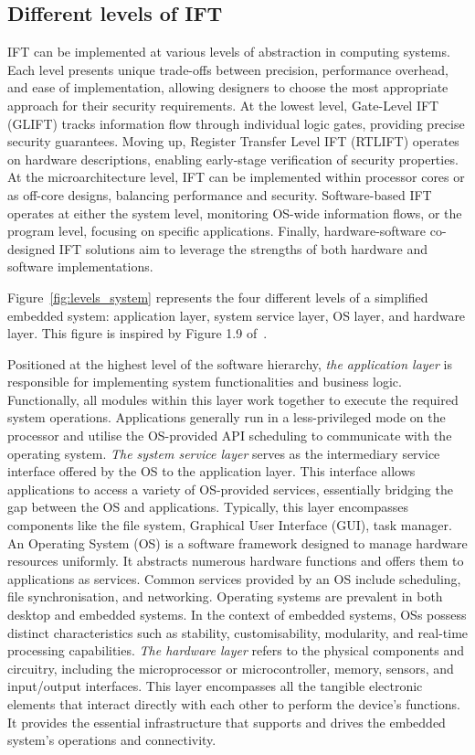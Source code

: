 \subsection{Different levels of IFT}
IFT can be implemented at various levels of abstraction in computing systems. Each level presents unique trade-offs between precision, performance overhead, and ease of implementation, allowing designers to choose the most appropriate approach for their security requirements.
At the lowest level, Gate-Level IFT (GLIFT) tracks information flow through individual logic gates, providing precise security guarantees.
Moving up, Register Transfer Level IFT (RTLIFT) operates on hardware descriptions, enabling early-stage verification of security properties.
At the microarchitecture level, IFT can be implemented within processor cores or as off-core designs, balancing performance and security.
Software-based IFT operates at either the system level, monitoring OS-wide information flows, or the program level, focusing on specific applications.
Finally, hardware-software co-designed IFT solutions aim to leverage the strengths of both hardware and software implementations.

Figure~\ref{fig:levels_system} represents the four different levels of a simplified embedded system: application layer, system service layer, OS layer, and hardware layer. This figure is inspired by Figure 1.9 of~\cite{ebrary}.

Positioned at the highest level of the software hierarchy, \textit{the application layer} is responsible for implementing system functionalities and business logic. Functionally, all modules within this layer work together to execute the required system operations. Applications generally run in a less-privileged mode on the processor and utilise the OS-provided API scheduling to communicate with the operating system.
\textit{The system service layer} serves as the intermediary service interface offered by the OS to the application layer. This interface allows applications to access a variety of OS-provided services, essentially bridging the gap between the OS and applications. Typically, this layer encompasses components like the file system, Graphical User Interface (GUI), task manager.
An Operating System (OS) is a software framework designed to manage hardware resources uniformly. It abstracts numerous hardware functions and offers them to applications as services. Common services provided by an OS include scheduling, file synchronisation, and networking. Operating systems are prevalent in both desktop and embedded systems. In the context of embedded systems, OSs possess distinct characteristics such as stability, customisability, modularity, and real-time processing capabilities.
\textit{The hardware layer} refers to the physical components and circuitry, including the microprocessor or microcontroller, memory, sensors, and input/output interfaces. This layer encompasses all the tangible electronic elements that interact directly with each other to perform the device's functions. It provides the essential infrastructure that supports and drives the embedded system’s operations and connectivity.

